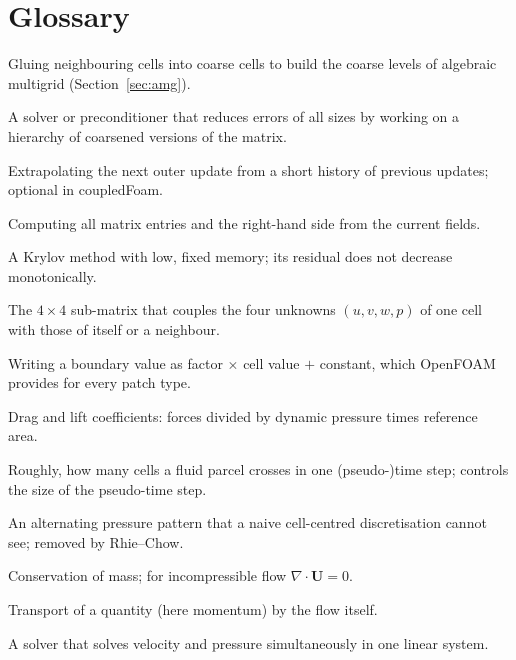 \documentclass[11pt,a4paper]{article}
\newcommand{\vect}[1]{\mathbf{#1}}
\newcommand{\Uv}{\vect{U}}
\begin{document}
\section*{Glossary}\label{sec:glossary}

\begin{description}\small
\item[Agglomeration.] Gluing neighbouring cells into coarse cells to build
  the coarse levels of algebraic multigrid (Section~\ref{sec:amg}).
\item[Algebraic multigrid (AMG, GAMG).] A solver or preconditioner that
  reduces errors of all sizes by working on a hierarchy of coarsened
  versions of the matrix.
\item[Anderson acceleration.] Extrapolating the next outer update from a
  short history of previous updates; optional in coupledFoam.
\item[Assembly.] Computing all matrix entries and the right-hand side from
  the current fields.
\item[BiCGStab.] A Krylov method with low, fixed memory; its residual does
  not decrease monotonically.
\item[Block.] The $4\times4$ sub-matrix that couples the four unknowns
  $(u,v,w,p)$ of one cell with those of itself or a neighbour.
\item[Boundary linearisation.] Writing a boundary value as factor $\times$
  cell value $+$ constant, which OpenFOAM provides for every patch type.
\item[$C_d$, $C_l$.] Drag and lift coefficients: forces divided by dynamic
  pressure times reference area.
\item[CFL number.] Roughly, how many cells a fluid parcel crosses in one
  (pseudo-)time step; controls the size of the pseudo-time step.
\item[Checkerboard mode.] An alternating pressure pattern that a naive
  cell-centred discretisation cannot see; removed by Rhie--Chow.
\item[Continuity.] Conservation of mass; for incompressible flow
  $\nabla\cdot\Uv=0$.
\item[Convection.] Transport of a quantity (here momentum) by the flow
  itself.
\item[Coupled solver.] A solver that solves velocity and pressure
  simultaneously in one linear system.

\end{description}
\end{document}
